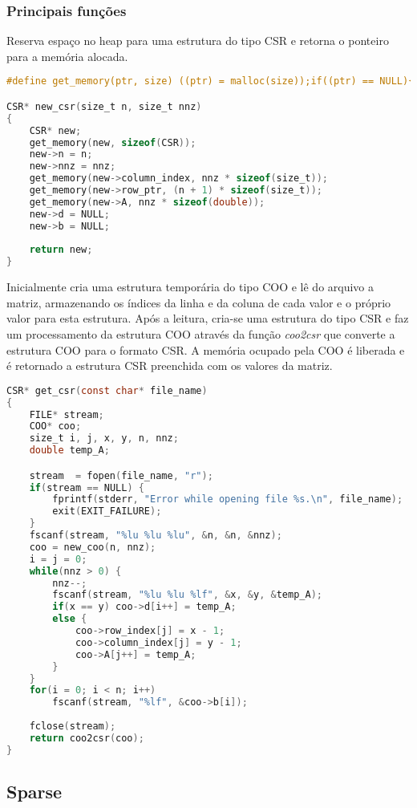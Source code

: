 \documentclass[
	article,			%
	11pt,				%
	oneside,			%
	a4paper,			%
	english,			%
	brazil,				%
	sumario=tradicional
	]{abntex2}
\begin{document}
\subsubsection{Principais funções}
Reserva espaço no heap para uma estrutura do tipo CSR e retorna o ponteiro para a memória alocada.
\begin{lstlisting}[language=C, caption=Função alocar memória CSR]
#define get_memory(ptr, size) ((ptr) = malloc(size));if((ptr) == NULL){fprintf(stderr, "Out of memory.\n");exit(EXIT_FAILURE);}

CSR* new_csr(size_t n, size_t nnz)
{
	CSR* new;
	get_memory(new, sizeof(CSR));
	new->n = n;
	new->nnz = nnz;
	get_memory(new->column_index, nnz * sizeof(size_t));
	get_memory(new->row_ptr, (n + 1) * sizeof(size_t));
	get_memory(new->A, nnz * sizeof(double));
	new->d = NULL;
	new->b = NULL;
	
	return new;
}
\end{lstlisting}

Inicialmente cria uma estrutura temporária do tipo COO e lê do arquivo a matriz, armazenando os índices da linha e  da coluna de cada valor e o próprio valor para esta estrutura. Após a leitura, cria-se uma estrutura do tipo CSR e faz um processamento da estrutura COO através da função \textit{coo2csr} que converte a estrutura COO para o formato CSR. A memória ocupado pela COO é liberada e é retornado a estrutura CSR preenchida com os valores da matriz. 
\begin{lstlisting}[language=C, caption=Função gerar CSR]
CSR* get_csr(const char* file_name)
{
	FILE* stream;
	COO* coo;
	size_t i, j, x, y, n, nnz;
	double temp_A;

	stream  = fopen(file_name, "r");
	if(stream == NULL) {
		fprintf(stderr, "Error while opening file %s.\n", file_name);
		exit(EXIT_FAILURE);
	}
	fscanf(stream, "%lu %lu %lu", &n, &n, &nnz);
	coo = new_coo(n, nnz);
	i = j = 0;
	while(nnz > 0) {
		nnz--;
		fscanf(stream, "%lu %lu %lf", &x, &y, &temp_A);
		if(x == y) coo->d[i++] = temp_A;
		else {
			coo->row_index[j] = x - 1;
			coo->column_index[j] = y - 1;
			coo->A[j++] = temp_A;
		}
	}
	for(i = 0; i < n; i++) 
		fscanf(stream, "%lf", &coo->b[i]);
	
	fclose(stream);
	return coo2csr(coo);
}
\end{lstlisting}

\subsection{Sparse}
\end{document}
